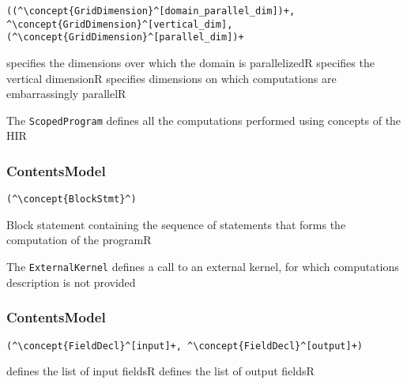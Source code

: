 \begin{lstlisting}[style=default]
((^\concept{GridDimension}^[domain_parallel_dim])+, ^\concept{GridDimension}^[vertical_dim], (^\concept{GridDimension}^[parallel_dim])+
\end{lstlisting}

\begin{HIRChildElements}
	{specifies the dimensions over which the domain is parallelized}{R}
	{specifies the vertical dimension}{R}
	{specifies dimensions on which computations are embarrassingly parallel}{R}
\end{HIRChildElements}


The {\tt ScopedProgram} defines all the computations performed using concepts of the HIR

\subsubsection*{ContentsModel}{}

\begin{lstlisting}[style=default]
(^\concept{BlockStmt}^)
\end{lstlisting}

\begin{HIRChildElements}
	{Block statement containing the sequence of statements that forms the computation of the program}{R}
\end{HIRChildElements}


The {\tt ExternalKernel} defines a call to an external kernel, for which computations description is not provided

\subsubsection*{ContentsModel}{}

\begin{lstlisting}[style=default]
(^\concept{FieldDecl}^[input]+, ^\concept{FieldDecl}^[output]+)
\end{lstlisting}

\begin{HIRChildElements}
	{defines the list of input fields}{R}
	{defines the list of output fields}{R}

\end{HIRChildElements}

